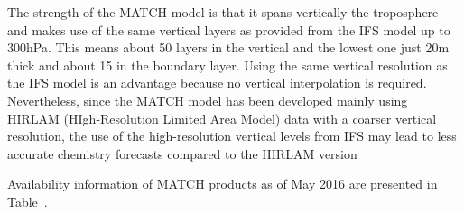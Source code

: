 \documentclass[9pt]{report}
\begin{document}
The strength of the MATCH model is that it spans vertically the troposphere and makes use of the same vertical layers as provided from the IFS model up to 300hPa. This means about 50 layers in the vertical and the lowest one just 20m thick and about 15 in the boundary layer. 
Using the same vertical resolution as the IFS model is an advantage because no vertical interpolation is required. 
Nevertheless, since the MATCH model has been developed mainly using HIRLAM (HIgh-Resolution Limited Area Model) data with a coarser vertical resolution, the use of the high-resolution vertical levels from IFS may lead to less accurate chemistry forecasts compared to the HIRLAM version%

Availability information of MATCH products as of May 2016 are presented in Table~.%

\begin{table}[h!]%
\begin{mdcenter}%
{}%
\end{mdcenter}\label{match-portfolio}%
\end{table}%
\end{document}
